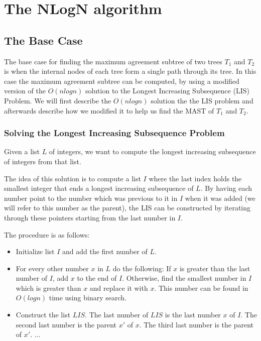 \chapter{The NLogN algorithm}


\section{The Base Case}
The base case for finding the maximum agreement subtree of two trees $T_1$ and $T_2$ is when the internal nodes of each tree form a single path through its tree. In this case the maximum agreement subtree can be computed, by using a modified version of the $O(nlogn)$ solution to the Longest Increasing Subsequence (LIS) Problem. We will first describe the $O(nlogn)$ solution the the LIS problem and afterwards describe how we modified it to help us find the MAST of $T_1$ and $T_2$.

\subsection{Solving the Longest Increasing Subsequence Problem}
Given a list $L$ of integers, we want to compute the longest increasing subsequence of integers from that list.


The idea of this solution is to compute a list $I$ where the last index holds the smallest integer that ends a longest increasing subsequence of $L$. By having each number point to the number which was previous to it in $I$ when it was added (we will refer to this number as the parent), the LIS can be constructed by iterating through these pointers starting from the last number in $I$.

The procedure is as follows:

\begin{itemize}
	\item Initialize list $I$ and add the first number of $L$.
	\item For every other number $x$ in $L$ do the following:
	\subitem If $x$ is greater than the last number of $I$, add $x$ to the end of $I$.
	\subitem Otherwise, find the smallest number in $I$ which is greater than $x$ and replace it with $x$. This number can be found in $O(logn)$ time using binary search.
	\item Construct the list $LIS$.
	\subitem The last number of $LIS$ is the last number $x$ of $I$.
	\subitem The second last number is the parent $x'$ of $x$.
	\subitem The third last number is the parent of $x'$.
	\subitem ...
\end{itemize}

